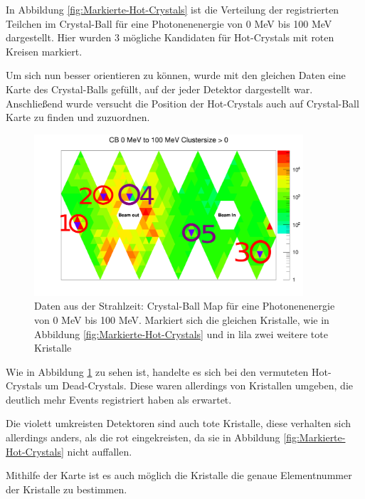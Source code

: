 \documentclass[a4paper,11pt,oneside,final,german,openbib,pdftex]{scrbook}
\begin{document}
{In Abbildung \ref{fig:Markierte-Hot-Crystals} ist die Verteilung der registrierten Teilchen im Crystal-Ball f\"ur eine Photonenenergie von 0 MeV bis 100 MeV dargestellt. Hier wurden 3 m\"ogliche Kandidaten f\"ur Hot-Crystals mit roten Kreisen markiert. 


Um sich nun besser orientieren zu k\"onnen, wurde mit den gleichen Daten eine Karte des Crystal-Balls gef\"ullt, auf der jeder Detektor dargestellt war.
Anschlie{\ss}end wurde versucht die Position der Hot-Crystals auch auf Crystal-Ball Karte zu finden und zuzuordnen.




\begin{figure}[h!]
	\begin{center}
		\includegraphics[width=100mm]{NewCalib/Strahlzeit2014/ClusterSizeNew/20172404Clustersize0Map100MeV}
		\caption[Strahlzeit: Markierte Dead-Crystals auf der CB-Karte; Niedrige Energien]{Daten aus der Strahlzeit: Crystal-Ball Map f\"ur eine Photonenenergie von 0 MeV bis 100 MeV. Markiert sich die gleichen Kristalle, wie in Abbildung \ref{fig:Markierte-Hot-Crystals} und in lila zwei weitere tote Kristalle}
		\label{fig:Makierte-Kristalle-Map}
	\end{center}
\end{figure}

Wie in Abbildung \ref{fig:Makierte-Kristalle-Map} zu sehen ist, handelte es sich bei den vermuteten Hot-Crystals um Dead-Crystals. Diese waren allerdings von Kristallen umgeben, die deutlich mehr Events registriert haben als erwartet.

Die violett umkreisten Detektoren sind auch tote Kristalle, diese verhalten sich allerdings anders, als die rot eingekreisten, da sie in Abbildung \ref{fig:Markierte-Hot-Crystals} nicht auffallen.

Mithilfe der Karte ist es auch m\"oglich die Kristalle die genaue Elementnummer der Kristalle zu bestimmen.

}
\end{document}
